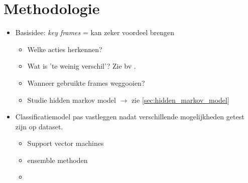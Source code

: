\chapter{Methodologie}
\label{ch:methodologie}

\begin{itemize}
	\item Basisidee: \textit{key frames} = kan zeker voordeel brengen
	\begin{itemize}
		\item Welke acties herkennen?  
		\item Wat is 'te weinig verschil'? Zie bv \cite{Suolan2017}.
		\item Wanneer gebruikte frames weggooien? 
		\item Studie hidden markov model $\rightarrow$ zie \ref{sec:hidden_markov_model}
	\end{itemize}
	\item Classificatiemodel pas vastleggen nadat verschillende mogelijkheden getest zijn op dataset.
	\begin{itemize}
		\item Support vector machines
		\item ensemble methoden
		\item {}
	\end{itemize}
\end{itemize}